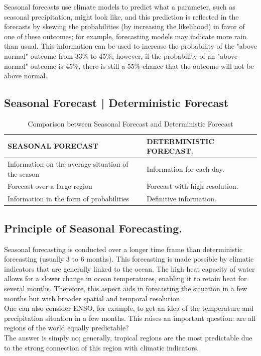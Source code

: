 \documentclass[11pt]{article}
\begin{document}
\vspace{0.3cm}

Seasonal forecasts use climate models to predict what a parameter, such as seasonal precipitation, might look like, and this prediction is reflected in the forecasts by skewing the probabilities (by increasing the likelihood) in favor of one of these outcomes; for example, forecasting models may indicate more rain than usual. This information can be used to increase the probability of the "above normal" outcome from 33\% to 45\%; however, if the probability of an "above normal" outcome is 45\%, there is still a 55\% chance that the outcome will not be above normal.
	\subsection{Seasonal Forecast | Deterministic Forecast}
		\begin{table}[h!]
		\centering
			\begin{tabular}{|>{\centering\arraybackslash}p{7cm}|>{\centering\arraybackslash}p{7cm}|}
				\hline
				\textbf{SEASONAL FORECAST} & \textbf{DETERMINISTIC FORECAST}.\\ 					
				\hline
				Information on the average situation of the season & Information for each day.\\ 
				\hline
				Forecast over a large region & Forecast with high resolution.\\
				\hline
				Information in the form of probabilities & Definitive information.\\
				\hline
			\end{tabular}
		\caption{Comparison between Seasonal Forecast and Deterministic Forecast}
		\end{table}
		
		
	\subsection{Principle of Seasonal Forecasting.}
	Seasonal forecasting is conducted over a longer time frame than deterministic forecasting (usually 3 to 6 months). This forecasting is made possible by climatic indicators that are generally linked to the ocean. The high heat capacity of water allows for a slower change in ocean temperatures, enabling it to retain heat for several months. Therefore, this aspect aids in forecasting the situation in a few months but with broader spatial and temporal resolution.\\
		One can also consider ENSO, for example, to get an idea of the temperature and precipitation situation in a few months. This raises an important question: are all regions of the world equally predictable?\\ 
		The answer is simply no; generally, tropical regions are the most predictable due to the strong connection of this region with climatic indicators.\\
\end{document}
